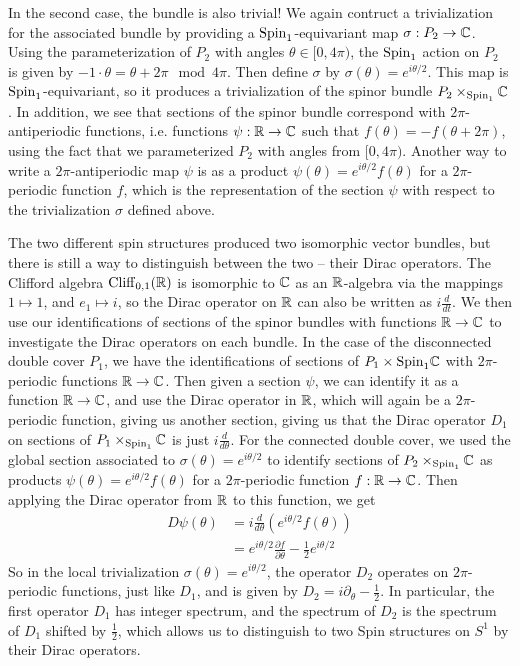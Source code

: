 \begin{exmp}
In the second case, the bundle is also trivial! We again contruct a trivialization
for the associated bundle by providing a $\mathrm{Spin}_1$-equivariant map
$\sigma : P_2 \to \mathbb{C}$. Using the parameterization of $P_2$ with angles
$\theta \in [0,4\pi)$, the $\mathrm{Spin}_1$ action on $P_2$ is given by
$-1 \cdot \theta = \theta + 2\pi \mod 4\pi$. Then define $\sigma$ by
$\sigma(\theta) = e^{i\theta/2}$. This map is $\mathrm{Spin}_1$-equivariant, so
it produces a trivialization of the spinor bundle $P_2 \times_{\mathrm{Spin}_1} \mathbb{C}$.
In addition, we see that sections of the spinor bundle correspond
with $2\pi$-antiperiodic functions, i.e. functions $\psi : \mathbb{R} \to \mathbb{C}$ such that
$f(\theta) = -f(\theta + 2\pi)$, using the fact that we parameterized $P_2$
with angles from $[0, 4\pi)$. Another way to write a $2\pi$-antiperiodic map
$\psi$ is as a product $\psi(\theta) = e^{i\theta/2}f(\theta)$ for a $2\pi$-periodic
function $f$, which is the representation of the section $\psi$ with respect to the
trivialization $\sigma$ defined above.

The two different spin structures produced two isomorphic vector bundles,
but there is still a way to distinguish between the two -- their Dirac operators.
The Clifford algebra $\operatorname{Cliff}_{0,1}(\mathbb{R})$ is isomorphic to $\mathbb{C}$ as an $\mathbb{R}$-algebra
via the mappings $1 \mapsto 1$, and $e_1 \mapsto i$, so the Dirac operator on
$\mathbb{R}$ can also be written as $i \frac{d}{dt}$. We then use our identifications
of sections of the spinor bundles with functions $\mathbb{R} \to \mathbb{C}$ to investigate the
Dirac operators on each bundle. In the case of the disconnected double cover $P_1$,
we have the identifications of sections of $P_1 \times{\mathrm{Spin}_1} \mathbb{C}$ with
$2\pi$-periodic functions $\mathbb{R} \to \mathbb{C}$. Then given a section $\psi$, we
can identify it as a function $\mathbb{R} \to \mathbb{C}$, and use the Dirac operator in $\mathbb{R}$,
which will again be a $2\pi$-periodic function, giving us another section,
giving us that the Dirac operator $D_1$ on sections of $P_1 \times_{\mathrm{Spin}_1} \mathbb{C}$
is just $i\frac{d}{d\theta}$. For the connected double cover, we used the
global section associated to $\sigma(\theta) = e^{i\theta /2}$ to identify
sections of $P_2 \times_{\mathrm{Spin}_1} \mathbb{C}$ as products
$\psi(\theta) = e^{i\theta/2}f(\theta)$ for a $2\pi$-periodic function $f : \mathbb{R} \to \mathbb{C}$.
Then applying the Dirac operator from $\mathbb{R}$ to this function, we get
%
\begin{align*}
D\psi(\theta) &= i\frac{d}{d\theta}\left( e^{i\theta/2}f(\theta) \right) \\
&= e^{i\theta/2}\frac{\partial f}{\partial \theta} - \frac{1}{2}e^{i\theta/2}
\end{align*}
%
So in the local trivialization $\sigma(\theta) = e^{i\theta/2}$, the operator $D_2$
operates on $2\pi$-periodic functions, just like $D_1$, and is given by
$D_2 = i\partial_\theta - \frac{1}{2}$. In particular, the first operator $D_1$ has
integer spectrum, and the spectrum of $D_2$ is the spectrum of $D_1$ shifted by
$\frac{1}{2}$, which allows us to distinguish to two Spin structures on $S^1$
by their Dirac operators.
%
\end{exmp}
